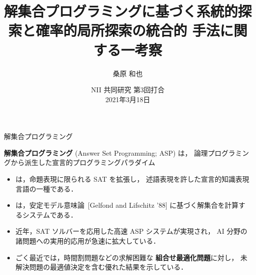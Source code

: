 \documentclass[11pt,dvipdfmx]{beamer}
\title{解集合プログラミングに基づく系統的探索と確率的局所探索の統合的
  手法に関する一考察}
\author{桑原 和也}
\institute{名古屋大学大学院情報学研究科 番原研究室}
\date{NII 共同研究 第3回打合\\2021年3月18日}
\begin{document}
\maketitle
\begin{frame}{解集合プログラミング}
  \begin{alertblock}{}\centering
    \alert{\bf 解集合プログラミング} (Answer Set Programming; ASP) は，
    論理プログラミングから派生した宣言的プログラミングパラダイム
  \end{alertblock}
  \bigskip
  \begin{itemize}
  \item {}は，命題表現に限られる SAT を拡張し，
    述語表現を許した宣言的知識表現言語の一種である．
  \item {}は，安定モデル意味論~[Gelfond and Lifschitz '88]
    に基づく解集合を計算するシステムである．
  \item 近年，SAT ソルバーを応用した高速 ASP システムが実現され，
    AI 分野の諸問題への実用的応用が急速に拡大している．
  \item ごく最近では，時間割問題などの求解困難な
    \alert{\bf 組合せ最適化問題}に対し，
    未解決問題の最適値決定を含む優れた結果を示している．
  \end{itemize}
\end{frame}
\end{document}
